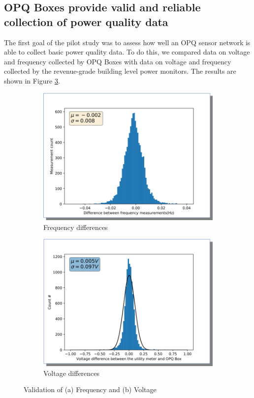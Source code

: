 \subsection{OPQ Boxes provide valid and reliable collection of power quality data}

The first goal of the pilot study was to assess how well an OPQ sensor network is able to collect basic power quality data. To do this, we compared data on voltage and frequency collected by OPQ Boxes with data on voltage and frequency collected by the revenue-grade building level power monitors.  The results are shown in Figure \ref{fig:opqbox-f-v-validation}.

\begin{figure}[ht]
	\centering
	\begin{subfigure}{.5\textwidth}
	  \centering
	  \includegraphics[width=0.9\linewidth]{images/pilot/opqbox-frequency-validation.png}
	  \caption{Frequency differences}
	  \label{fig:opqbox-validation-1}
	\end{subfigure}%
	\begin{subfigure}{.5\textwidth}
	  \centering
	  \includegraphics[width=0.9\linewidth]{images/pilot/opqbox-voltage-validation.png}
	  \caption{Voltage differences}
	  \label{fig:opqbox-validation-2}
	\end{subfigure}
	\caption{Validation of (a) Frequency and (b) Voltage}
	\label{fig:opqbox-f-v-validation}
\end{figure}

